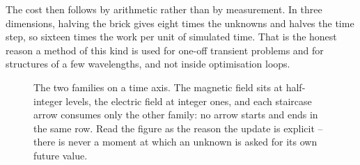 The cost then follows by arithmetic rather than by measurement. In three dimensions, halving the brick gives
eight times the unknowns and halves the time step, so sixteen times the work per unit of simulated time. That is
the honest reason a method of this kind is used for one-off transient problems and for structures of a few
wavelengths, and not inside optimisation loops.

\begin{figure}[htbp]
\centering
{}
\caption{The two families on a time axis. The magnetic field sits at half-integer levels, the electric field at
integer ones, and each staircase arrow consumes only the other family: no arrow starts and ends in the same row.
Read the figure as the reason the update is explicit -- there is never a moment at which an unknown is asked for
its own future value.}
\label{fig:hiw:leapfrog}
\end{figure}

